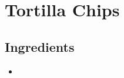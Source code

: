 \thispagestyle{fancy}
\section{Tortilla Chips}
\AddToShipoutPicture*{\TortillaChips}

\subsection*{Ingredients}
\begin{multicols}{3}
	\begin{itemize}
		\item 
	\end{itemize}
\end{multicols}
